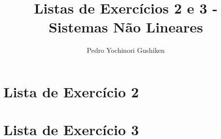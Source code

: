 \documentclass[11pt]{report}
\title{Listas de Exercícios 2 e 3 - Sistemas Não Lineares}
\author{Pedro Yochinori Gushiken}
\begin{document}
\maketitle
\chapter{Lista de Exercício 2}

\chapter{Lista de Exercício 3}

\end{document}
